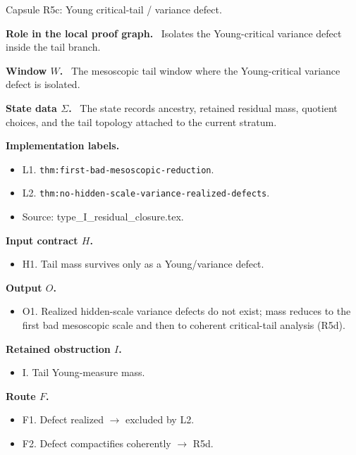 \documentclass[11pt]{amsart}
\newcommand{\capsulefield}[1]{\par\smallskip\noindent\textbf{#1.}\ }
\begin{document}
\begin{proofcapsule}{Capsule R5c: Young critical-tail / variance defect.}
  \capsulefield{Role in the local proof graph}
  Isolates the Young-critical variance defect inside the tail branch.

  \capsulefield{Window \(W\)}
The mesoscopic tail window where the Young-critical variance defect is isolated.

  \capsulefield{State data \(\Sigma\)}
The state records ancestry, retained residual mass, quotient choices, and the tail topology attached to the current stratum.

  \capsulefield{Implementation labels}
  \begin{itemize}[leftmargin=1.8em]
  \item L1. \texttt{thm:first-bad-mesoscopic-reduction}.
  \item L2. \texttt{thm:no-hidden-scale-variance-realized-defects}.
  \item Source: type\_I\_residual\_closure.tex.
  \end{itemize}

  \capsulefield{Input contract \(H\)}
  \begin{itemize}[leftmargin=1.8em]
  \item H1. Tail mass survives only as a Young/variance defect.
  \end{itemize}

  \capsulefield{Output \(O\)}
  \begin{itemize}[leftmargin=1.8em]
  \item O1. Realized hidden-scale variance defects do not exist; mass reduces to the first bad mesoscopic scale and then to coherent critical-tail analysis (R5d).
  \end{itemize}

  \capsulefield{Retained obstruction \(I\)}
  \begin{itemize}[leftmargin=1.8em]
  \item I. Tail Young-measure mass.
  \end{itemize}

  \capsulefield{Route \(F\)}
  \begin{itemize}[leftmargin=1.8em]
  \item F1. Defect realized $\to$ excluded by L2.
  \item F2. Defect compactifies coherently $\to$ R5d.
  \end{itemize}


\end{proofcapsule}
\end{document}
